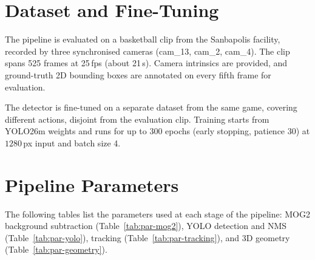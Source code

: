 \appendix
\providecommand{\multirow}[3]{#3}

\section{Dataset and Fine-Tuning}\label{app:dataset}
The pipeline is evaluated on a basketball clip from the Sanbapolis facility, recorded by
three synchronised cameras (cam\_13, cam\_2, cam\_4).
The clip spans 525 frames at 25\,fps (about 21\,s).
Camera intrinsics are provided, and ground-truth 2D bounding boxes are annotated on every fifth frame for evaluation.

The detector is fine-tuned on a separate dataset from the same game, covering different actions,
disjoint from the evaluation clip. Training starts from YOLO26m weights and runs for up to 300 epochs (early stopping,
patience 30) at $1280$\,px input and batch size 4.

\section{Pipeline Parameters}\label{app:parameters}
The following tables list the parameters used at each stage of the pipeline: MOG2
background subtraction (Table~\ref{tab:par-mog2}), YOLO detection and NMS
(Table~\ref{tab:par-yolo}), tracking (Table~\ref{tab:par-tracking}), and 3D geometry
(Table~\ref{tab:par-geometry}).

